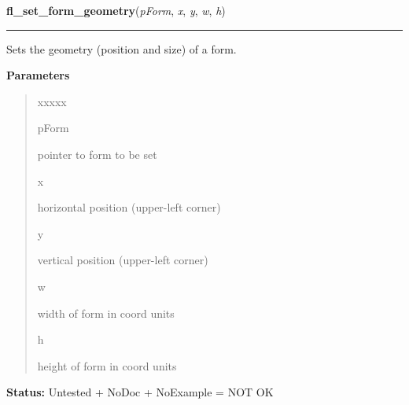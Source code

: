 \hspace{.8\funcindent}\begin{boxedminipage}{\funcwidth}

    \raggedright \textbf{fl\_set\_form\_geometry}(\textit{pForm}, \textit{x}, \textit{y}, \textit{w}, \textit{h})

    \vspace{-1.5ex}

    \rule{\textwidth}{0.5\fboxrule}
\setlength{\parskip}{2ex}
    Sets the geometry (position and size) of a form.

\setlength{\parskip}{1ex}
      \textbf{Parameters}
      \vspace{-1ex}

      \begin{quote}
        \begin{Ventry}{xxxxx}

          \item[pForm]

          pointer to form to be set

          \item[x]

          horizontal position (upper-left corner)

          \item[y]

          vertical position (upper-left corner)

          \item[w]

          width of form in coord units

          \item[h]

          height of form in coord units

        \end{Ventry}

      \end{quote}

\textbf{Status:} Untested + NoDoc + NoExample = NOT OK



    \end{boxedminipage}

    \label{xformslib:library:fl_set_form_geometry}

    \vspace{0.5ex}

